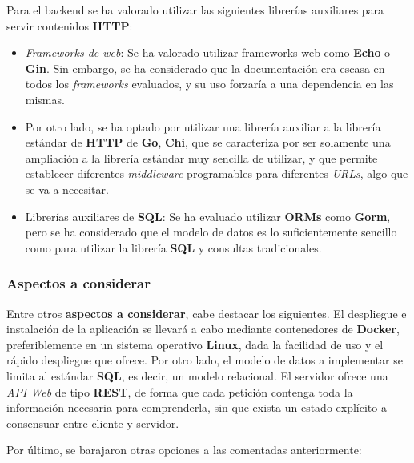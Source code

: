 \documentclass[11pt, a4paper, titlepage]{article}
\begin{document}
Para el backend se ha valorado utilizar las siguientes librerías auxiliares para servir contenidos \textbf{HTTP}:

\begin{itemize}
    \item \textit{Frameworks de web}: Se ha valorado utilizar frameworks web como \textbf{Echo} o \textbf{Gin}. Sin embargo, se ha considerado que  la documentación era escasa en todos los \textit{frameworks} evaluados, y su uso forzaría a una dependencia en las mismas. 
    
    \item Por otro lado, se ha optado por utilizar una librería auxiliar a la librería estándar de \textbf{HTTP} de \textbf{Go}, \textbf{Chi}, que se caracteriza por ser solamente una ampliación a la librería estándar muy sencilla de utilizar, y que permite establecer diferentes \textit{middleware} programables para diferentes \textit{URLs}, algo que se va a necesitar.
    
    \item Librerías auxiliares de \textbf{SQL}: Se ha evaluado utilizar \textbf{ORMs} como \textbf{Gorm}, pero se ha considerado que el modelo de datos es lo suficientemente sencillo como para utilizar la librería \textbf{SQL} y consultas tradicionales.
\end{itemize}

\subsubsection{Aspectos a considerar}

Entre otros \textbf{aspectos a considerar}, cabe destacar los siguientes. El despliegue e instalación de la aplicación se llevará a cabo mediante contenedores de \textbf{Docker}, preferiblemente en un sistema operativo \textbf{Linux}, dada la facilidad de uso y el rápido despliegue que ofrece. Por otro lado, el modelo de datos a implementar se limita al estándar \textbf{SQL}, es decir, un modelo relacional. El servidor ofrece una \textit{API Web} de tipo \textbf{REST}, de forma que cada petición contenga toda la información necesaria para comprenderla, sin que exista un estado explícito a consensuar entre cliente y servidor. \newline

Por último, se barajaron otras opciones a las comentadas anteriormente:
\end{document}
